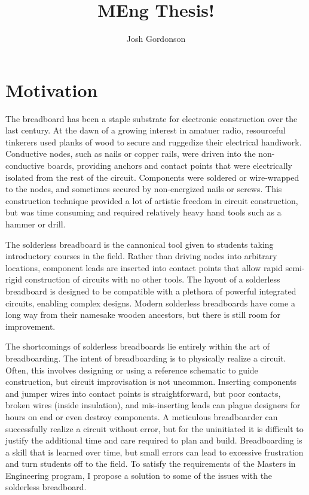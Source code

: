 \documentclass[11pt, a4paper]{article}
\title{MEng Thesis!}
\author{Josh Gordonson}
\begin{document}
\maketitle

\section{Motivation}
The breadboard has been a staple substrate for electronic construction over the last century.
At the dawn of a growing interest in amatuer radio, resourceful tinkerers used planks of wood to secure and ruggedize their electrical handiwork.
Conductive nodes, such as nails or copper rails, were driven into the non-conductive boards, providing anchors and contact points that were electrically isolated from the rest of the circuit.
Components were soldered or wire-wrapped to the nodes, and sometimes secured by non-energized nails or screws.
This construction technique provided a lot of artistic freedom in circuit construction, but was time consuming and required relatively heavy hand tools such as a hammer or drill.

The solderless breadboard is the cannonical tool given to students taking introductory courses in the field.
Rather than driving nodes into arbitrary locations, component leads are inserted into contact points that allow rapid semi-rigid construction of circuits with no other tools.
The layout of a solderless breadboard is designed to be compatible with a plethora of powerful integrated circuits, enabling complex designs.
Modern solderless breadboards have come a long way from their namesake wooden ancestors, but there is still room for improvement. 

The shortcomings of solderless breadboards lie entirely within the art of breadboarding.
The intent of breadboarding is to physically realize a circuit.
Often, this involves designing or using a reference schematic to guide construction, but circuit improvisation is not uncommon.
Inserting components and jumper wires into contact points is straightforward, but poor contacts, broken wires (inside insulation), and mis-inserting leads can plague designers for hours on end or even destroy components.
A meticulous breadboarder can successfully realize a circuit without error, but for the uninitiated it is difficult to justify the additional time and care required to plan and build.
Breadboarding is a skill that is learned over time, but small errors can lead to excessive frustration and turn students off to the field.
To satisfy the requirements of the Masters in Engineering program, I propose a solution to some of the issues with the solderless breadboard.
\end{document}
